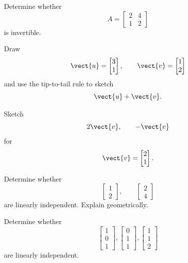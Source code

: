 \begin{exercise}[2]
Determine whether
\[ A=\begin{bmatrix}2&4\\1&2\end{bmatrix} \]
is invertible.
\end{exercise}

\begin{exercise}[1]
Draw
\[ \vect{u}=\begin{bmatrix}3\\1\end{bmatrix},
\qquad
\vect{v}=\begin{bmatrix}1\\2\end{bmatrix} \]
and use the tip-to-tail rule to sketch
\[ \vect{u}+\vect{v}. \]
\end{exercise}

\begin{exercise}[1]
Sketch
\[ 2\vect{v},\qquad -\vect{v} \]
for
\[ \vect{v}=\begin{bmatrix}2\\1\end{bmatrix}. \]
\end{exercise}

\begin{exercise}[2]
Determine whether
\[ \begin{bmatrix}1\\2\end{bmatrix},
\qquad
\begin{bmatrix}2\\4\end{bmatrix} \]
are linearly independent. Explain geometrically.
\end{exercise}

\begin{exercise}[2]
Determine whether
\[ \begin{bmatrix}1\\0\\1\end{bmatrix},
\begin{bmatrix}0\\1\\1\end{bmatrix},
\begin{bmatrix}1\\1\\2\end{bmatrix} \]
are linearly independent.
\end{exercise}

